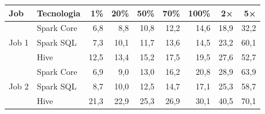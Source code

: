 \begin{tabular}{@{}l l rrrrrrr@{}}
\toprule
Job & Tecnologia & 1\% & 20\% & 50\% & 70\% & 100\% & 2× & 5× \\
\midrule
\multirow{3}{*}{Job 1} & Spark Core & 6,8 & 8,8 & 10,8 & 12,2 & 14,6 & 18,9 & 32,2 \\
 & Spark SQL & 7,3 & 10,1 & 11,7 & 13,6 & 14,5 & 23,2 & 60,1 \\
 & Hive & 12,5 & 13,4 & 15,2 & 17,5 & 19,5 & 27,6 & 52,7 \\
\midrule
\multirow{3}{*}{Job 2} & Spark Core & 6,9 & 9,0 & 13,0 & 16,2 & 20,8 & 28,9 & 63,9 \\
 & Spark SQL & 8,7 & 10,0 & 12,5 & 14,7 & 17,1 & 25,3 & 58,7 \\
 & Hive & 21,3 & 22,9 & 25,3 & 26,9 & 30,1 & 40,5 & 70,1 \\
\bottomrule
\end{tabular}